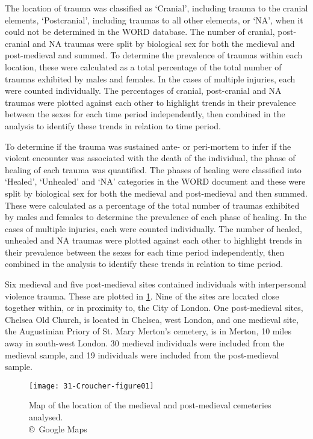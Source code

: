 %
The location of trauma was classified as ‘Cranial’, including trauma to the cranial elements, ‘Postcranial’, including traumas to all other elements, or ‘NA’, when it could not be determined in the WORD database. The number of cranial, post-cranial and NA traumas were split by biological sex for both the medieval and post-medieval and summed. To determine the prevalence of traumas within each location, these were calculated as a total percentage of the total number of traumas exhibited by males and females. In the cases of multiple injuries, each were counted individually. The percentages of cranial, post-cranial and NA traumas were plotted against each other to highlight trends in their prevalence between the sexes for each time period independently, then combined in the analysis to identify these trends in relation to time period.

%
To determine if the trauma was sustained ante- or peri-mortem to infer if the violent encounter was associated with the death of the individual, the phase of healing of each trauma was quantified.  The phases of healing were classified into ‘Healed’, ‘Unhealed’ and ‘NA’ categories in the WORD document and these were split by biological sex for both the medieval and post-medieval and then summed. These were calculated as a percentage of the total number of traumas exhibited by males and females to determine the prevalence of each phase of healing. In the cases of multiple injuries, each were counted individually. The number of healed, unhealed and NA traumas were plotted against each other to highlight trends in their prevalence between the sexes for each time period independently, then combined in the analysis to identify these trends in relation to time period.

Six medieval and five post-medieval sites contained individuals with interpersonal violence trauma.  These are plotted in \cref{fig:31-Croucher-figure01}. 
Nine of the sites are located close together within, or in proximity to, the City of London. One post-medieval sites, Chelsea Old Church, is located in Chelsea, west London, and one medieval site, the Augustinian Priory of St. Mary Merton’s cemetery, is in Merton, 10 miles away in south-west London. 
30 medieval individuals were included from the medieval sample, and 19 individuals were included from the post-medieval sample.  

\begin{figure}[!htb]
	\texttt{[image: 31-Croucher-figure01]}
	\caption{Map of the location of the medieval and post-medieval cemeteries analysed.
		{\normalfont\scriptsize \\ \copyright\ Google Maps
	}}
	\label{fig:31-Croucher-figure01}
\end{figure}

